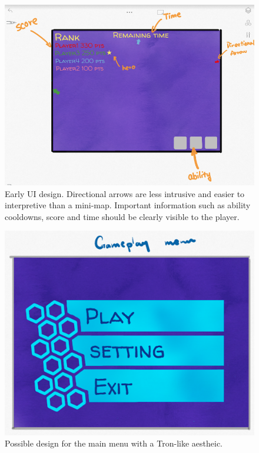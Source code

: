 \documentclass{article}
\theoremstyle{definition}
\begin{document}
\begin{figure}[htpb]
  \centering
  \includegraphics[width=0.8\linewidth]{images/ingame_ui.png}
  \caption{Early UI design. Directional arrows are less intrusive and easier to
  interpretive than a mini-map. Important information such as ability
cooldowns, score and time should be clearly visible to the player.}
\label{fig:ingame_ui}
\end{figure}

\begin{figure}[htpb]
  \centering
  \includegraphics[width=0.8\linewidth]{images/main_menu.png}
  \caption{Possible design for the main menu with a Tron-like aestheic.}
\label{fig:main_menu}
\end{figure}
\end{document}
